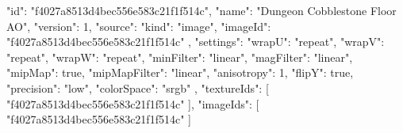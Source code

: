 {
  "id": "f4027a8513d4bec556e583c21f1f514c",
  "name": "Dungeon Cobblestone Floor AO",
  "version": 1,
  "source": {
    "kind": "image",
    "imageId": "f4027a8513d4bec556e583c21f1f514c"
  },
  "settings": {
    "wrapU": "repeat",
    "wrapV": "repeat",
    "wrapW": "repeat",
    "minFilter": "linear",
    "magFilter": "linear",
    "mipMap": true,
    "mipMapFilter": "linear",
    "anisotropy": 1,
    "flipY": true,
    "precision": "low",
    "colorSpace": "srgb"
  },
  "textureIds": [
    "f4027a8513d4bec556e583c21f1f514c"
  ],
  "imageIds": [
    "f4027a8513d4bec556e583c21f1f514c"
  ]
}
